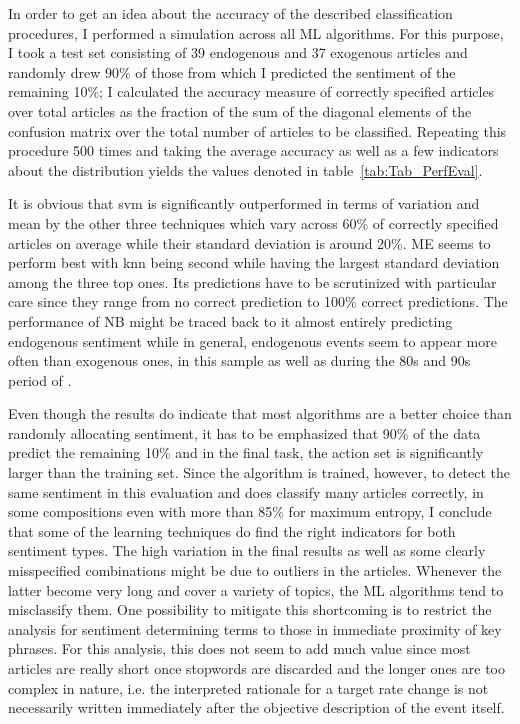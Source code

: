 In order to get an idea about the accuracy of the described classification procedures, I performed a simulation across all ML algorithms. For this purpose, I took a test set consisting of 39 endogenous and 37 exogenous articles and randomly drew 90\% of those from which I predicted the sentiment of the remaining 10\%; I calculated the accuracy measure of correctly specified articles over total articles as the fraction of the sum of the diagonal elements of the confusion matrix over the total number of articles to be classified. Repeating this procedure 500 times and taking the average accuracy as well as a few indicators about the distribution yields the values denoted in table~\vref{tab:Tab_PerfEval}.

%
It is obvious that svm is significantly outperformed in terms of variation and mean by the other three techniques which vary across 60\% of correctly specified articles on average while their standard deviation is around 20\%. ME seems to perform best with knn being second while having the largest standard deviation among the three top ones. Its predictions have to be scrutinized with particular care since they range from no correct prediction to 100\% correct predictions. The performance of NB might be traced back to it almost entirely predicting endogenous sentiment while in general, endogenous events seem to appear more often than exogenous ones, in this sample as well as during the 80s and 90s period of \textcite{Ellingsen.2003}.

Even though the results do indicate that most algorithms are a better choice than randomly allocating sentiment, it has to be emphasized that 90\% of the data predict the remaining 10\% and in the final task, the action set is significantly larger than the training set. Since the algorithm is trained, however, to detect the same sentiment in this evaluation and does classify many articles correctly, in some compositions even with more than 85\% for maximum entropy, I conclude that some of the learning techniques do find the right indicators for both sentiment types. The high variation in the final results as well as some clearly misspecified combinations might be due to outliers in the articles. Whenever the latter become very long and cover a variety of topics, the ML algorithms tend to misclassify them. One possibility to mitigate this shortcoming is to restrict the analysis for sentiment determining terms to those in immediate proximity of key phrases. For this analysis, this does not seem to add much value since most articles are really short once stopwords are discarded and the longer ones are too complex in nature, i.e. the interpreted rationale for a target rate change is not necessarily written immediately after the objective description of the event itself.

